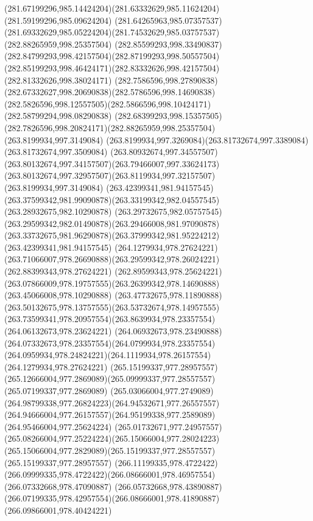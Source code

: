 {{		\curveto(281.67199296,985.14424204)(281.63332629,985.11624204)(281.59199296,985.09624204)
		\curveto(281.64265963,985.07357537)(281.69332629,985.05224204)(281.74532629,985.03757537)
		\moveto(282.88265959,998.25357504)
		\curveto(282.85599293,998.33490837)(282.84799293,998.42157504)(282.87199293,998.50557504)
		\curveto(282.85199293,998.46424171)(282.83332626,998.42157504)(282.81332626,998.38024171)
		\curveto(282.7586596,998.27890838)(282.67332627,998.20690838)(282.5786596,998.14690838)
		\curveto(282.5826596,998.12557505)(282.5866596,998.10424171)(282.58799294,998.08290838)
		\curveto(282.68399293,998.15357505)(282.7826596,998.20824171)(282.88265959,998.25357504)
		\moveto(263.8199934,997.3149084)
		\curveto(263.8199934,997.3269084)(263.81732674,997.3389084)(263.81732674,997.3509084)
		\curveto(263.80932674,997.34557507)(263.80132674,997.34157507)(263.79466007,997.33624173)
		\curveto(263.80132674,997.32957507)(263.8119934,997.32157507)(263.8199934,997.3149084)
		\moveto(263.42399341,981.94157545)
		\curveto(263.37599342,981.99090878)(263.33199342,982.04557545)(263.28932675,982.10290878)
		\curveto(263.29732675,982.05757545)(263.29599342,982.01490878)(263.29466008,981.97090878)
		\curveto(263.33732675,981.96290878)(263.37999342,981.95224212)(263.42399341,981.94157545)
		\moveto(264.1279934,978.27624221)
		\curveto(263.71066007,978.26690888)(263.29599342,978.26024221)(262.88399343,978.27624221)
		\lineto(262.89599343,978.25624221)
		\curveto(263.07866009,978.19757555)(263.26399342,978.14690888)(263.45066008,978.10290888)
		\curveto(263.47732675,978.11890888)(263.50132675,978.13757555)(263.53732674,978.14957555)
		\curveto(263.73599341,978.20957554)(263.8639934,978.23357554)(264.06132673,978.23624221)
		\curveto(264.06932673,978.23490888)(264.07332673,978.23357554)(264.0799934,978.23357554)
		\curveto(264.0959934,978.24824221)(264.1119934,978.26157554)(264.1279934,978.27624221)
		\moveto(265.15199337,977.28957557)
		\curveto(265.12666004,977.2869089)(265.09999337,977.28557557)(265.07199337,977.2869089)
		\curveto(265.03066004,977.2749089)(264.98799338,977.26824223)(264.94532671,977.26557557)
		\curveto(264.94666004,977.26157557)(264.95199338,977.2589089)(264.95466004,977.25624224)
		\curveto(265.01732671,977.24957557)(265.08266004,977.25224224)(265.15066004,977.28024223)
		\curveto(265.15066004,977.2829089)(265.15199337,977.28557557)(265.15199337,977.28957557)
		\moveto(266.11199335,978.4722422)
		\curveto(266.09999335,978.4722422)(266.08666001,978.46957554)(266.07332668,978.47090887)
		\lineto(266.05732668,978.43890887)
		\curveto(266.07199335,978.42957554)(266.08666001,978.41890887)(266.09866001,978.40424221)
}}
